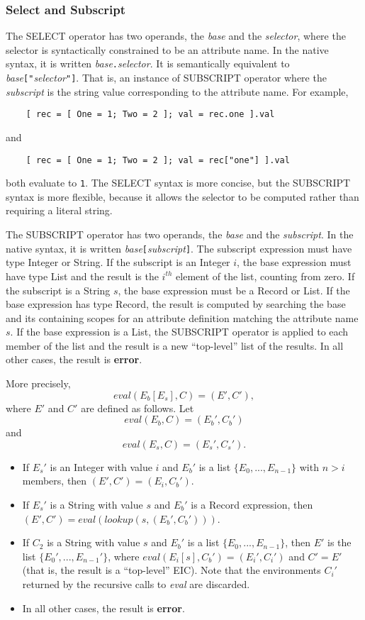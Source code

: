 \documentclass{article}
\begin{document}
\subsubsection{Select and Subscript}
The SELECT operator has two operands, the \emph{base} and the \emph{selector},
where the selector is syntactically constrained to be an attribute name.
In the native syntax, it is written \emph{base}\verb|.|\emph{selector}.
It is semantically equivalent to \emph{base}\verb/["/\emph{selector}\verb/"]/.
That is, an instance of SUBSCRIPT operator where the \emph{subscript} is
the string value corresponding to the attribute name.
For example,
\begin{verbatim}    [ rec = [ One = 1; Two = 2 ]; val = rec.one ].val\end{verbatim}
and
\begin{verbatim}    [ rec = [ One = 1; Two = 2 ]; val = rec["one"] ].val\end{verbatim}
both evaluate to \verb/1/.
The SELECT syntax is more concise, but the SUBSCRIPT syntax is more flexible,
because it allows the selector to be computed rather than requiring a literal
string.

The SUBSCRIPT operator has two operands, the \emph{base} and the
\emph{subscript}.
In the native syntax, it is written
\emph{base}\verb|[|\emph{subscript}\verb|]|.
The subscript expression must have type Integer or String.
If the subscript is an Integer $i$, the base expression must have type List and
the result is the $i^{th}$ element of the list, counting from zero.
If the subscript is a String $s$, the base expression must be a
Record or List.  If the base expression has type Record,
the result is computed by searching the base and its containing scopes for an
attribute definition matching the attribute name $s$.
If the base expression is a List, the SUBSCRIPT operator is applied to
each member of the list and the result is a new ``top-level'' list of the
results.
In all other cases, the result is \textbf{error}.

More precisely,
\[ eval(E_b[E_s], C)  = (E', C'), \]
where $E'$ and $C'$ are defined as follows.
Let
\[ eval(E_b, C) = (E_b', C_b') \] and
\[ eval(E_s, C) = (E_s', C_s'). \]
\begin{itemize}
\item 
If $E_s'$ is an Integer with value $i$ and $E_b'$ is a list
$\{ E_0, ..., E_{n - 1}\}$ with $n > i$ members,
then $(E', C') = (E_i, C_b')$.
\item
If $E_s'$ is a String with value $s$ and $E_b'$ is a Record expression,
then $(E', C') = \mathit{eval}(\mathit{lookup}(s, (E_b', C_b')))$.
\item
If $C_2$ is a String with value $s$ and $E_b'$ is a list
$\{ E_0, ..., E_{n - 1}\}$, then $E'$ is the list
$\{ E_0', ..., E_{n - 1}'\}$, where $\mathit{eval}(E_i[s], C_b') = (E_i', C_i')$
and $C' = E'$ (that is, the result is a ``top-level'' EIC).
Note that the environments $C_i'$ returned by the recursive calls to
\emph{eval} are discarded.
\item
In all other cases, the result is \textbf{error}.
\end{itemize}
\end{document}
